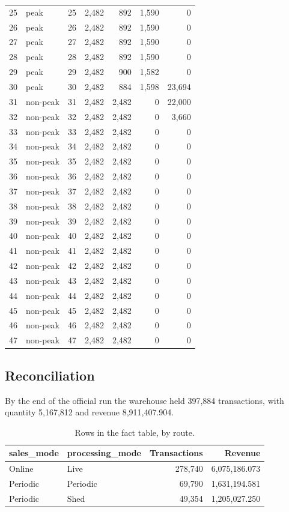 \documentclass[11pt,a4paper]{article}
\begin{document}
\begin{longtable}{rlrrrrr}
25 & peak & 25 & 2,482 & 892 & 1,590 & 0 \\
26 & peak & 26 & 2,482 & 892 & 1,590 & 0 \\
27 & peak & 27 & 2,482 & 892 & 1,590 & 0 \\
28 & peak & 28 & 2,482 & 892 & 1,590 & 0 \\
29 & peak & 29 & 2,482 & 900 & 1,582 & 0 \\
30 & peak & 30 & 2,482 & 884 & 1,598 & 23,694 \\
31 & non-peak & 31 & 2,482 & 2,482 & 0 & 22,000 \\
32 & non-peak & 32 & 2,482 & 2,482 & 0 & 3,660 \\
33 & non-peak & 33 & 2,482 & 2,482 & 0 & 0 \\
34 & non-peak & 34 & 2,482 & 2,482 & 0 & 0 \\
35 & non-peak & 35 & 2,482 & 2,482 & 0 & 0 \\
36 & non-peak & 36 & 2,482 & 2,482 & 0 & 0 \\
37 & non-peak & 37 & 2,482 & 2,482 & 0 & 0 \\
38 & non-peak & 38 & 2,482 & 2,482 & 0 & 0 \\
39 & non-peak & 39 & 2,482 & 2,482 & 0 & 0 \\
40 & non-peak & 40 & 2,482 & 2,482 & 0 & 0 \\
41 & non-peak & 41 & 2,482 & 2,482 & 0 & 0 \\
42 & non-peak & 42 & 2,482 & 2,482 & 0 & 0 \\
43 & non-peak & 43 & 2,482 & 2,482 & 0 & 0 \\
44 & non-peak & 44 & 2,482 & 2,482 & 0 & 0 \\
45 & non-peak & 45 & 2,482 & 2,482 & 0 & 0 \\
46 & non-peak & 46 & 2,482 & 2,482 & 0 & 0 \\
47 & non-peak & 47 & 2,482 & 2,482 & 0 & 0 \\
\end{longtable}

\subsection{Reconciliation}

By the end of the official run the warehouse held 397,884 transactions, with quantity 5,167,812 and revenue 8,911,407.904.

\begin{table}[ht]\centering
\caption{Rows in the fact table, by route.}
\begin{tabular}{llrr}
\toprule \textbf{sales\_mode} & \textbf{processing\_mode} & \textbf{Transactions} & \textbf{Revenue} \\ \midrule
Online & Live & 278,740 & 6,075,186.073 \\
Periodic & Periodic & 69,790 & 1,631,194.581 \\
Periodic & Shed & 49,354 & 1,205,027.250 \\
\bottomrule\end{tabular}
\end{table}
\end{document}
